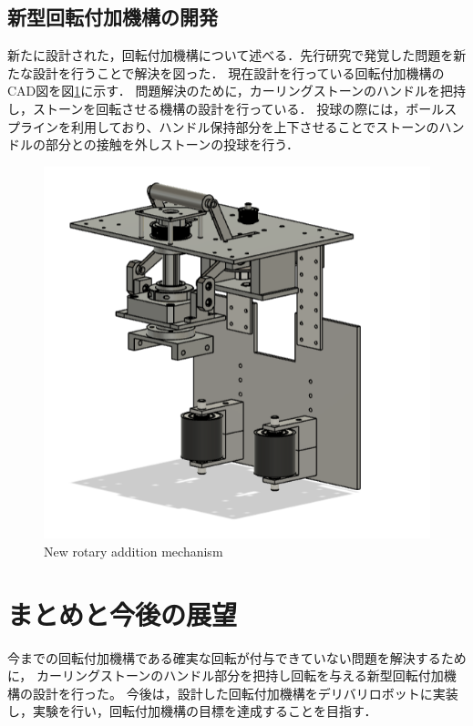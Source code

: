 \documentclass{classes/sice-si}
\begin{document}
\subsection{新型回転付加機構の開発}
新たに設計された，回転付加機構について述べる．先行研究で発覚した問題を新たな設計を行うことで解決を図った．
現在設計を行っている回転付加機構のCAD図を図\ref{fig:new}に示す．
問題解決のために，カーリングストーンのハンドルを把持し，ストーンを回転させる機構の設計を行っている．
投球の際には，ボールスプラインを利用しており、ハンドル保持部分を上下させることでストーンのハンドルの部分との接触を外しストーンの投球を行う．
\begin{figure}[H]
    \centering
    \begin{minipage}{0.6\linewidth}
        \includegraphics[width=\linewidth]{figures/4.png}
        \caption{New rotary addition mechanism}
        \label{fig:new}
    \end{minipage}
    \hfill
    \vspace{0pt} %
\end{figure}



\section{まとめと今後の展望}
今までの回転付加機構である確実な回転が付与できていない問題を解決するために，
カーリングストーンのハンドル部分を把持し回転を与える新型回転付加機構の設計を行った。
今後は，設計した回転付加機構をデリバリロボットに実装し，実験を行い，回転付加機構の目標を達成することを目指す．



\printbibliography[title=参考文献]
\end{document}
